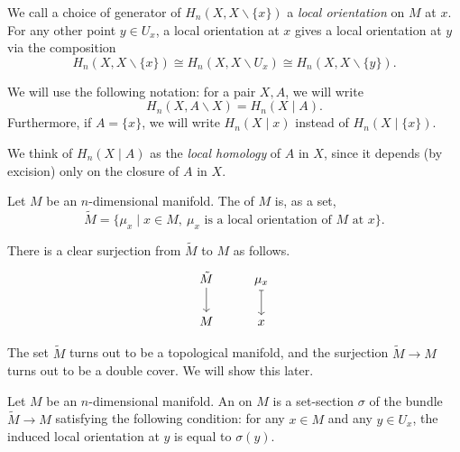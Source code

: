 \documentclass[main.tex]{subfiles}
\begin{document}
We call a choice of generator of \(H_{n}(X, X \smallsetminus \{x\} )\) a \emph{local orientation} on \(M\) at \(x\). For any other point \(y \in U_{x}\), a local orientation at \(x\) gives a local orientation at \(y\) via the composition
\begin{equation*}
  H_{n}(X, X\smallsetminus \{x\}) \cong H_{n}(X, X\smallsetminus U_{x}) \cong H_{n}(X, X\smallsetminus \{y\}).
\end{equation*}

We will use the following notation: for a pair \(X, A\), we will write
\begin{equation*}
  H_{n}(X, A \smallsetminus X) = H_{n}(X \mid A).
\end{equation*}
Furthermore, if \(A = \{x\}\), we will write \(H_{n}(X \mid x)\) instead of \(H_{n}(X \mid \{x\})\).

We think of \(H_{n}(X \mid A)\) as the \emph{local homology} of \(A\) in \(X\), since it depends (by excision) only on the closure of \(A\) in \(X\).

\begin{definition}
  \label{def:orientation_cover}
  Let \(M\) be an \(n\)-dimensional manifold. The  of \(M\) is, as a set,
  \begin{equation*}
    \tilde{M} = \{\mu_{x} \mid x \in M,\ \mu_{x} \text{ is a local orientation of }M \text{ at }x\}.
  \end{equation*}
\end{definition}

There is a clear surjection from \(\tilde{M}\) to \(M\) as follows.
\begin{equation*}
  \begin{tikzcd}
    \tilde{M}
    \arrow[d]
    & \mu_{x}
    \arrow[d, mapsto]
    \\
    M
    & x
  \end{tikzcd}
\end{equation*}

The set \(\tilde{M}\) turns out to be a topological manifold, and the surjection \(\tilde{M} \to M\) turns out to be a double cover. We will show this later.

\begin{definition}[orientation]
  \label{def:orientation}
  Let \(M\) be an \(n\)-dimensional manifold. An  on \(M\) is a set-section \(\sigma\) of the bundle \(\tilde{M} \to M\) satisfying the following condition: for any \(x \in M\) and any \(y \in U_{x}\), the induced local orientation at \(y\) is equal to \(\sigma(y)\).
\end{definition}
\end{document}

